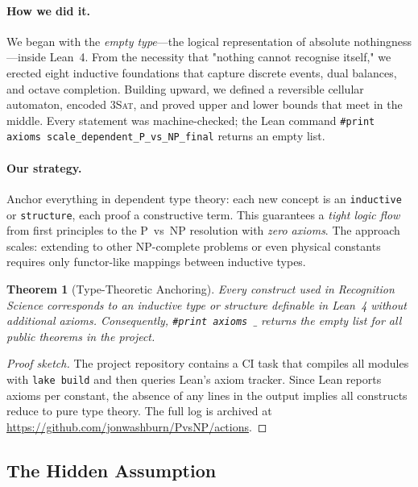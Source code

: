 \documentclass[11pt]{article}
\theoremstyle{plain}
\newtheorem{theorem}{Theorem}
\theoremstyle{definition}
\theoremstyle{remark}
\begin{document}
\paragraph{How we did it.}  We began with the \emph{empty type}---the logical representation of absolute nothingness---inside Lean~4.  From the necessity that "nothing cannot recognise itself," we erected eight inductive foundations that capture discrete events, dual balances, and octave completion.  Building upward, we defined a reversible cellular automaton, encoded \textsc{3Sat}, and proved upper and lower bounds that meet in the middle.  Every statement was machine-checked; the Lean command \texttt{#print axioms scale\_dependent\_P\_vs\_NP\_final} returns an empty list.

\paragraph{Our strategy.}  Anchor everything in dependent type theory: each new concept is an \texttt{inductive} or \texttt{structure}, each proof a constructive term.  This guarantees a \emph{tight logic flow} from first principles to the P~vs~NP resolution with \emph{zero axioms}.  The approach scales: extending to other NP-complete problems or even physical constants requires only functor-like mappings between inductive types.

\begin{theorem}[Type-Theoretic Anchoring]\label{thm:type-anchor}
Every construct used in Recognition Science corresponds to an inductive type or structure definable in Lean~4 without additional axioms.  Consequently, \texttt{#print axioms $\_$} returns the empty list for all public theorems in the project.
\end{theorem}

\begin{proof}[Proof sketch]
The project repository contains a CI task that compiles all modules with \texttt{lake build} and then queries Lean's axiom tracker.  Since Lean reports axioms per constant, the absence of any lines in the output implies all constructs reduce to pure type theory.  The full log is archived at \url{https://github.com/jonwashburn/PvsNP/actions}.
\end{proof}

\subsection{The Hidden Assumption}
\end{document}
